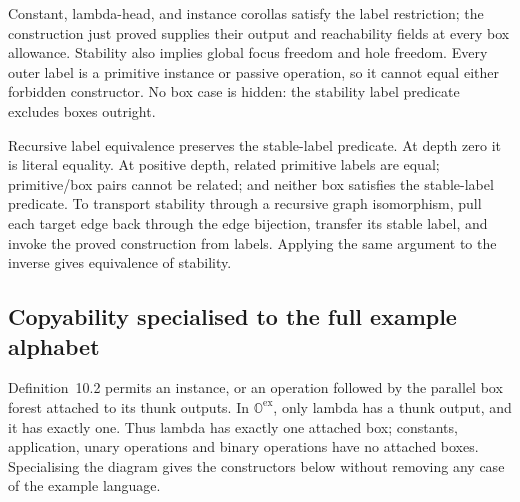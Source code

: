 

Constant, lambda-head, and instance corollas satisfy the label restriction;
the construction just proved supplies their output and reachability fields
at every box allowance. Stability also implies global focus freedom and
hole freedom. Every outer label is a primitive instance or passive operation,
so it cannot equal either forbidden constructor. No box case is hidden:
the stability label predicate excludes boxes outright.






Recursive label equivalence preserves the stable-label predicate. At depth
zero it is literal equality. At positive depth, related primitive labels
are equal; primitive/box pairs cannot be related; and neither box satisfies
the stable-label predicate. To transport stability through a recursive graph
isomorphism, pull each target edge back through the edge bijection, transfer
its stable label, and invoke the proved construction from labels. Applying
the same argument to the inverse gives equivalence of stability.




\subsection{Copyability specialised to the full example alphabet}
Definition~10.2 permits an instance, or an operation followed by the parallel
box forest attached to its thunk outputs. In $\mathbb O^{\mathrm{ex}}$, only
lambda has a thunk output, and it has exactly one. Thus lambda has exactly
one attached box; constants, application, unary operations and binary
operations have no attached boxes. Specialising the diagram gives the
constructors below without removing any case of the example language.

